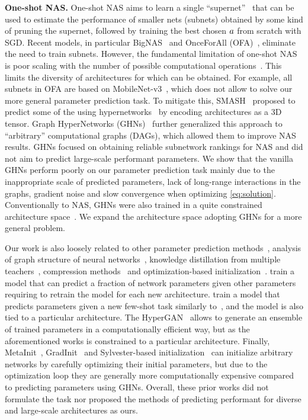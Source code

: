 \textbf{One-shot NAS.} One-shot NAS aims to learn a single ``supernet''~\citep{yu2020bignas,cai2019onceforall,he2021automl} that can be used to estimate the performance of smaller nets (subnets) obtained by some kind of pruning the supernet, followed by training the best chosen $a$ from scratch with SGD.
Recent models, in particular BigNAS~\citep{cai2019onceforall} and OnceForAll (OFA)~\citep{yu2020bignas}, eliminate the need to train subnets. However, the fundamental limitation of one-shot NAS is poor scaling with the number of possible computational operations~\citep{zhang2018graph}. This limits the diversity of architectures for which \params can be obtained. For example, all subnets in OFA are based on MobileNet-v3~\citep{howard2019searching}, which does not allow to solve our more general parameter prediction task.
To mitigate this, SMASH~\citep{brock2017smash} proposed to predict some of the \params using hypernetworks~\citep{ha2016hypernetworks} by encoding architectures as a 3D tensor.
Graph HyperNetworks (GHNs)~\citep{zhang2018graph} further generalized this approach to ``arbitrary'' computational graphs (DAGs), which allowed them to improve NAS results.
GHNs focused on obtaining reliable subnetwork rankings for NAS and did not aim to predict large-scale performant parameters.
We show that the vanilla GHNs perform poorly on
our parameter prediction task mainly due to the inappropriate scale of predicted parameters, lack of long-range interactions in the graphs, gradient noise and slow convergence when optimizing \eqref{eq:solution}.
Conventionally to NAS, GHNs were also trained in a quite constrained architecture space~\citep{bender2018understanding}. We expand the architecture space adopting GHNs for a more general problem.

Our work is also loosely related to other parameter prediction methods~\citep{Denil2013-la,bertinetto2016learning,ratzlaff2019hypergan}, analysis of graph structure of neural networks~\citep{you2020graph}, knowledge distillation from multiple teachers~\citep{liu2019knowledge}, compression methods~\citep{cheng2017survey} and optimization-based initialization~\citep{dauphin2019metainit,zhu2021gradinit,das2021data}. \citet{Denil2013-la} train a model that can predict a fraction of network parameters given other parameters requiring to retrain the model for each new architecture.
\citet{bertinetto2016learning} train a model that predicts parameters given a new few-shot task similarly to~\citep{ravi2016optimization,requeima2019fast}, and the model is also tied to a particular architecture.
The HyperGAN~\citep{ratzlaff2019hypergan} allows to generate an ensemble of trained parameters in a computationally efficient way, but as the aforementioned works is constrained to a particular architecture.
Finally, MetaInit~\citep{dauphin2019metainit}, GradInit~\citep{zhu2021gradinit} and Sylvester-based initialization~\citep{das2021data} can initialize arbitrary networks by carefully optimizing their initial parameters, but due to the optimization loop they are generally more computationally expensive compared to predicting parameters using GHNs.
Overall, these prior works did not formulate the task nor proposed the methods of predicting performant \params for diverse and large-scale architectures as ours.

